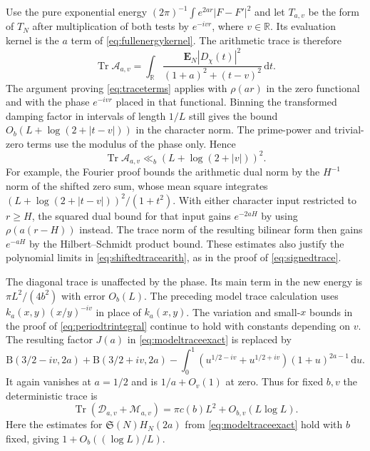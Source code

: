 \documentclass[11pt,a4paper]{article}
\numberwithin{equation}{section}
\newcommand{\SSS}{\mathfrak S}
\newcommand{\ud}{\mathrm d}
\begin{document}
Use the pure exponential energy
$(2\pi)^{-1}\int e^{2ar}|F-F'|^2$ and let $T_{a,v}$
be the form of $T_N$ after multiplication of both tests
by $e^{-iv r}$, where $v\in\mathbb R$. Its evaluation
kernel is the $a$ term of \cref{eq:fullenergykernel}.
The arithmetic trace is therefore
\begin{equation}
 \operatorname{Tr}\mathcal A_{a,v}
     =\int_{\mathbb R}\frac{\mathbf E_N|D_\chi(t)|^2}
                             {(1+a)^2+(t-v)^2}\,\ud t .
 \label{eq:shiftedtracearith}
\end{equation}
The argument proving \cref{eq:traceterms} applies with
$\rho(ar)$ in the zero functional and with the phase
$e^{-iv r}$ placed in that functional. Binning the
transformed damping factor in intervals of length $1/L$
still gives the bound $O_b(L+\log(2+|t-v|))$ in the
character norm. The prime-power and trivial-zero terms
use the modulus of the phase only. Hence
\begin{equation}
 \operatorname{Tr}\mathcal A_{a,v}
                  \ll_b (L+\log(2+|v|))^2 .
 \label{eq:localderivativeupper}
\end{equation}
For example, the Fourier proof bounds the arithmetic
dual norm by the $H^{-1}$ norm of the shifted zero sum,
whose mean square integrates
$(L+\log(2+|t-v|))^2/(1+t^2)$.
With either character input restricted to $r\ge H$,
the squared dual bound for that input gains $e^{-2aH}$
by using $\rho(a(r-H))$ instead. The trace norm of the
resulting bilinear form then gains $e^{-aH}$ by the
Hilbert--Schmidt product bound. These estimates also
justify the polynomial limits in \cref{eq:shiftedtracearith},
as in the proof of \cref{eq:signedtrace}.

The diagonal trace is unaffected by the phase. Its
main term in the new energy is $\pi L^2/(4b^2)$ with
error $O_b(L)$. The preceding model trace calculation uses
$k_a(x,y)(x/y)^{-iv}$ in place of $k_a(x,y)$.
The variation and small-$x$ bounds in the proof of
\cref{eq:periodtrintegral} continue to hold with constants
depending on $v$. The resulting factor $J(a)$ in
\cref{eq:modeltraceexact} is replaced by
\[
 \mathrm B(3/2-iv,2a)+\mathrm B(3/2+iv,2a)
  -\int_0^1 (u^{1/2-iv}+u^{1/2+iv})(1+u)^{2a-1}\,\ud u .
\]
It again vanishes at $a=1/2$ and is $1/a+O_v(1)$
at zero. Thus for fixed $b,v$ the deterministic trace is
\begin{equation}
 \operatorname{Tr}(\mathcal D_{a,v}+\mathcal M_{a,v})
        =\pi c(b)L^2+O_{b,v}(L\log L).
 \label{eq:shiftedtracedet}
\end{equation}
Here the estimates for $\SSS(N)H_N(2a)$ from
\cref{eq:modeltraceexact} hold with $b$ fixed, giving
$1+O_b((\log L)/L)$.
\end{document}
